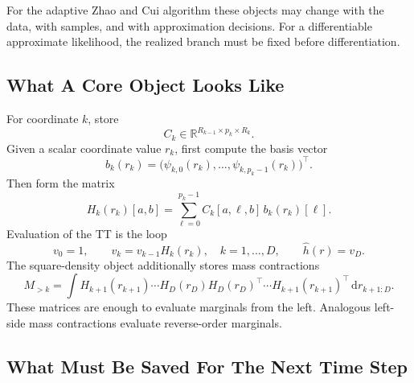 \documentclass[11pt]{article}
\numberwithin{equation}{section}
\newcommand{\R}{\mathbb R}
\newcommand{\dd}{\,\mathrm d}
\begin{document}
For the adaptive Zhao and Cui \cite{zhao2024ttsequential} algorithm these objects may change with the data,
with samples, and with approximation decisions.  For a differentiable
approximate likelihood, the realized branch must be fixed before
differentiation.

\subsection{What A Core Object Looks Like}

For coordinate \(k\), store
\[
    C_k\in\R^{R_{k-1}\times p_k\times R_k}.
\]
Given a scalar coordinate value \(r_k\), first compute the basis vector
\[
    b_k(r_k)=
    \bigl(\psi_{k,0}(r_k),\ldots,\psi_{k,p_k-1}(r_k)\bigr)^\top.
\]
Then form the matrix
\begin{equation}
    H_k(r_k)[a,b]
    =
    \sum_{\ell=0}^{p_k-1}C_k[a,\ell,b]\,b_k(r_k)[\ell].
    \label{eq:p24-d1}
\end{equation}
Evaluation of the TT is the loop
\begin{equation}
    v_0=1,\qquad
    v_k=v_{k-1}H_k(r_k),\quad k=1,\ldots,D,
    \qquad
    \widehat h(r)=v_D.
    \label{eq:p24-d2}
\end{equation}
The square-density object additionally stores mass contractions
\begin{equation}
    M_{>k}
    =
    \int H_{k+1}(r_{k+1})\cdots H_D(r_D)
    H_D(r_D)^\top\cdots H_{k+1}(r_{k+1})^\top
    \dd r_{k+1:D}.
    \label{eq:p24-d3}
\end{equation}
These matrices are enough to evaluate marginals from the left.  Analogous
left-side mass contractions evaluate reverse-order marginals.

\subsection{What Must Be Saved For The Next Time Step}
\end{document}
